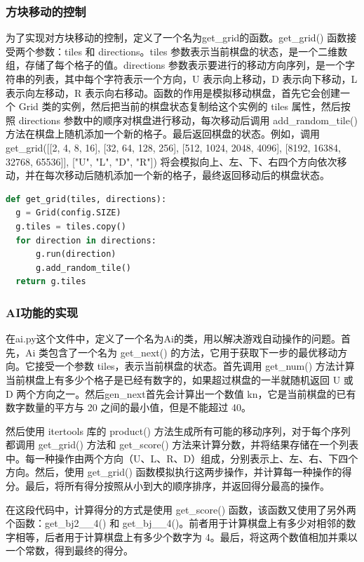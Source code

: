 \documentclass[UTF8,AutoFakeBold,AutoFakeSlant,zihao=-4]{ctexart}
\begin{document}
\subsubsection{方块移动的控制}
为了实现对方块移动的控制，定义了一个名为get\_grid的函数。get\_grid() 函数接受两个参数：tiles 和 directions。tiles 参数表示当前棋盘的状态，是一个二维数组，存储了每个格子的值。directions 参数表示要进行的移动方向序列，是一个字符串的列表，其中每个字符表示一个方向，U 表示向上移动，D 表示向下移动，L 表示向左移动，R 表示向右移动。函数的作用是模拟移动棋盘，首先它会创建一个 Grid 类的实例，然后把当前的棋盘状态复制给这个实例的 tiles 属性，然后按照 directions 参数中的顺序对棋盘进行移动，每次移动后调用 add\_random\_tile() 方法在棋盘上随机添加一个新的格子。最后返回棋盘的状态。例如，调用 get\_grid([[2, 4, 8, 16], [32, 64, 128, 256], [512, 1024, 2048, 4096], [8192, 16384, 32768, 65536]], ["U", "L", "D", "R"]) 将会模拟向上、左、下、右四个方向依次移动，并在每次移动后随机添加一个新的格子，最终返回移动后的棋盘状态。

\begin{lstlisting}[language=Python]
  def get_grid(tiles, directions):
  g = Grid(config.SIZE)
  g.tiles = tiles.copy()
  for direction in directions:
      g.run(direction)
      g.add_random_tile()
  return g.tiles

\end{lstlisting}

\subsubsection{AI功能的实现}
在ai.py这个文件中，定义了一个名为Ai的类，用以解决游戏自动操作的问题。首先，Ai 类包含了一个名为 get\_next() 的方法，它用于获取下一步的最优移动方向。它接受一个参数 tiles，表示当前棋盘的状态。首先调用 get\_num() 方法计算当前棋盘上有多少个格子是已经有数字的，如果超过棋盘的一半就随机返回 U 或 D 两个方向之一。然后gen\_next首先会计算出一个数值 kn，它是当前棋盘的已有数字数量的平方与 20 之间的最小值，但是不能超过 40。

然后使用 itertools 库的 product() 方法生成所有可能的移动序列，对于每个序列都调用 get\_grid() 方法和 get\_score() 方法来计算分数，并将结果存储在一个列表中。每一种操作由两个方向（U、L、R、D）组成，分别表示上、左、右、下四个方向。然后，使用 get\_grid() 函数模拟执行这两步操作，并计算每一种操作的得分。最后，将所有得分按照从小到大的顺序排序，并返回得分最高的操作。

在这段代码中，计算得分的方式是使用 get\_score() 函数，该函数又使用了另外两个函数：get\_bj2\_\_4() 和 get\_bj\_\_4()。前者用于计算棋盘上有多少对相邻的数字相等，后者用于计算棋盘上有多少个数字为 4。最后，将这两个数值相加并乘以一个常数，得到最终的得分。
\end{document}
